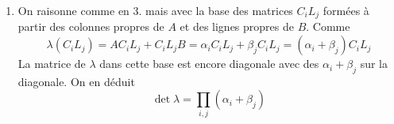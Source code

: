 \begin{enumerate}
 \item On raisonne comme en 3. mais avec la base des matrices $C_iL_j$ formées à partir des colonnes propres de $A$ et des lignes propres de $B$. Comme
\begin{displaymath}
 \lambda(C_iL_j)=AC_iL_j+ C_iL_jB=\alpha_i C_iL_j + \beta_j C_iL_j = (\alpha_i + \beta_j)C_iL_j
\end{displaymath}
La matrice de $\lambda$ dans cette base est encore diagonale avec des $\alpha_i + \beta_j$ sur la diagonale. On en déduit
\begin{displaymath}
 \det \lambda = \prod_{i,j}(\alpha_i + \beta_j)
\end{displaymath}

\end{enumerate}
